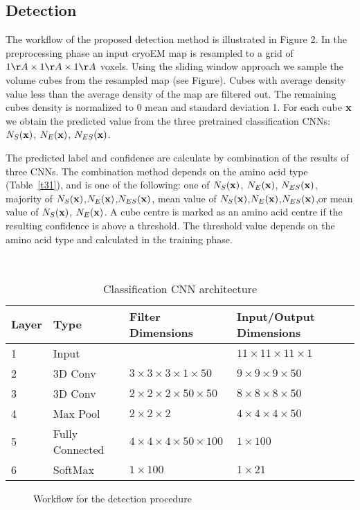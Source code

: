 \subsection{Detection}
The workflow of the  proposed detection method is illustrated in Figure 2.
In the preprocessing phase an input cryoEM map is resampled to a grid of $1 \AA \times 1 \AA \times 1 \AA $ voxels.  
Using the sliding window approach we sample the volume cubes from the resampled map (see Figure).
Cubes with average density value less than the average density of the map are filtered out.
The remaining cubes density is normalized to 0 mean  and standard deviation 1.
For each cube $\mathbf{x}$ we obtain the predicted value from the three pretrained classification CNNs: $N_S(\mathbf{x})$, $N_E(\mathbf{x})$, $N_{ES}(\mathbf{x})$.

The predicted label and confidence are calculate by combination of the results of three CNNs.
The combination method depends on the amino acid type (Table~\ref{t31}), and is one of the following: one of $N_S(\mathbf{x})$, $N_E(\mathbf{x})$, $N_{ES}(\mathbf{x})$, majority of $N_S(\mathbf{x})$,$N_E(\mathbf{x})$,$N_{ES}(\mathbf{x})$, mean value of  $N_S(\mathbf{x})$,$N_E(\mathbf{x})$,$N_{ES}(\mathbf{x})$,or  mean value of  $N_S(\mathbf{x})$, $N_E(\mathbf{x})$.
A cube centre is marked as an amino acid centre if the resulting confidence is above a threshold.  
The threshold value depends on the amino acid type and calculated in the training phase.

\begin{table}
 \tiny
\caption{ Classification CNN architecture}\
\label{ta}
\begin{center}
\begin{tabular}{ | m{1.5em} | m{1.8cm} | m{}|m{}| }
 \hline
 Layer & Type & Filter Dimensions & Input/Output Dimensions \\
 \hline
 \hline
1 &  Input & & $11 \times 11 \times 11 \times 1 $ \\
\hline
2 &  3D Conv & $3 \times 3 \times 3  \times 1 \times 50 $ & $9 \times 9 \times 9 \times 50 $ \\
\hline
3 &  3D Conv & $2 \times 2 \times 2 \times 50 \times 50 $ & $8 \times 8 \times 8 \times 50 $ \\
\hline
4 &  Max Pool & $2 \times 2 \times 2  $ & $4 \times 4 \times 4 \times 50 $ \\
\hline
5 &  Fully Connected &  $4 \times 4 \times 4 \times 50 \times 100 $ & $1 \times 100 $ \\
\hline
6 &  SoftMax &  $1 \times 100 $ & $1 \times 21 $ \\
\hline

\end{tabular}
\end{center}
\end{table}

\begin{figure}[!ht]
  \centering
	
  \caption{Workflow for the detection procedure  }\label{f:det_scheme}
\end{figure}
